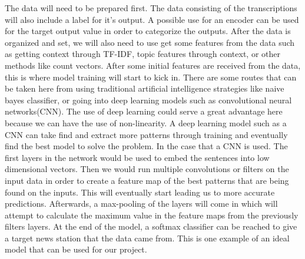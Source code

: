 The data will need to be prepared first. 
The data consisting of the transcriptions will also include a label for it's output. 
A possible use for an encoder can be used for the target output value in order to categorize the outputs. 
After the data is organized and set, we will also need to use get some features from the data such as getting context through TF-IDF, topic features through context, or other methods like count vectors. 
After some initial features are received from the data, this is where model training will start to kick in. 
There are some routes that can be taken here from using traditional artificial intelligence strategies like naive bayes classifier, or going into deep learning models such as convolutional neural networks(CNN). 
The use of deep learning could serve a great advantage here because we can have the use of non-linearity. 
A deep learning model such as a CNN can take find and extract more patterns through training and eventually find the best model to solve the problem. 
In the case that a CNN is used. 
The first layers in the network would be used to embed the sentences into low dimensional vectors. 
Then we would run multiple convolutions or filters on the input data in order to create a feature map of the best patterns that are being found on the inputs. 
This will eventually start leading us to more accurate predictions. 
Afterwards, a max-pooling of the layers will come in which will attempt to calculate the maximum value in the feature maps from the previously filters layers. 
At the end of the model, a softmax classifier can be reached to give a target news station that the data came from. 
This is one example of an ideal model that can be used for our project.
 
